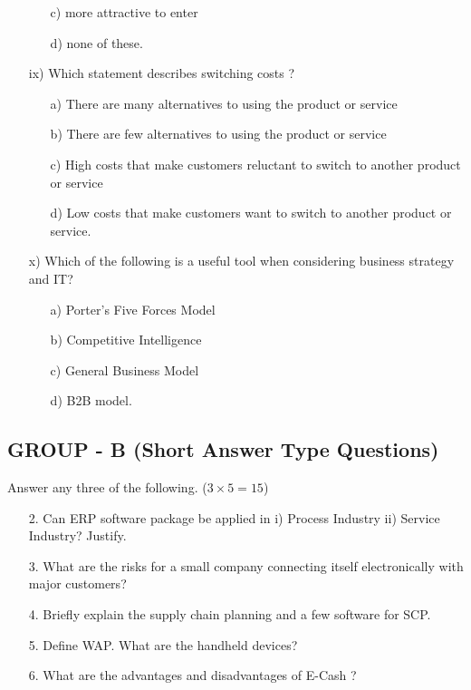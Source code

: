 \documentclass{article}
\begin{document}
\begin{enumerate}
\begin{enumerate}
        \item[c)] more attractive to enter
        \item[d)] none of these.
    \end{enumerate}
    \item[ix)] Which statement describes switching costs ?
    \begin{enumerate}
        \item[a)] There are many alternatives to using the product or service
        \item[b)] There are few alternatives to using the product or service
        \item[c)] High costs that make customers reluctant to switch to another product or service
        \item[d)] Low costs that make customers want to switch to another product or service.
    \end{enumerate}
    \item[x)] Which of the following is a useful tool when considering business strategy and IT?
    \begin{enumerate}
        \item[a)] Porter's Five Forces Model
        \item[b)] Competitive Intelligence
        \item[c)] General Business Model
        \item[d)] B2B model.
    \end{enumerate}
\end{enumerate}

\subsection*{GROUP - B (Short Answer Type Questions)}
Answer any three of the following. ($3 \times 5 = 15$)
\begin{enumerate}
    \item[2.] Can ERP software package be applied in 
    i) Process Industry 
    ii) Service Industry? 
    Justify.
    \item[3.] What are the risks for a small company connecting itself electronically with major customers?
    \item[4.] Briefly explain the supply chain planning and a few software for SCP.
    \item[5.] Define WAP. What are the handheld devices?
    \item[6.] What are the advantages and disadvantages of E-Cash ?
\end{enumerate}
\end{document}
